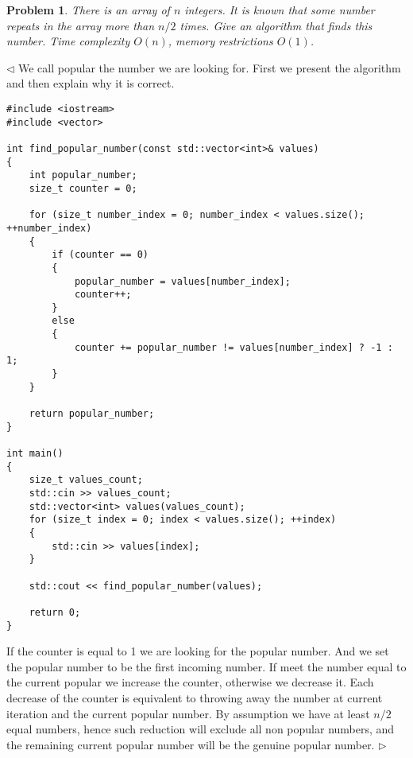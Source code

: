 \documentclass[12pt]{article}
\newtheorem{problem}{Problem}[subsection]
\newenvironment{solution}{\par $\triangleleft$}{$\triangleright$}
\begin{document}
 
\begin{problem} There is an array of $n$ integers. It is known that some number repeats in the array more than $n/2$ times. Give an algorithm that finds this number. Time complexity $O(n)$, memory restrictions $O(1)$.
\end{problem}
\begin{solution} 
We call popular the number we are looking for. First we present the algorithm and then explain why it is correct.
\begin{verbatim}
#include <iostream>
#include <vector>
 
int find_popular_number(const std::vector<int>& values)
{
    int popular_number;
    size_t counter = 0;
 
    for (size_t number_index = 0; number_index < values.size(); ++number_index)
    {
        if (counter == 0)
        {
            popular_number = values[number_index];
            counter++;
        }
        else
        {
            counter += popular_number != values[number_index] ? -1 : 1;
        }
    }
 
    return popular_number;
}
 
int main()
{
    size_t values_count;
    std::cin >> values_count;
    std::vector<int> values(values_count);
    for (size_t index = 0; index < values.size(); ++index)
    {
        std::cin >> values[index];
    }
 
    std::cout << find_popular_number(values);
 
    return 0;
}
\end{verbatim}
 
If the counter is equal to 1 we are looking for the popular number. And we set the popular number to be the first incoming number. If meet the number equal to the current popular we increase the counter, otherwise we decrease it. Each decrease of the counter is equivalent to throwing away the number at current iteration and the current popular number. By assumption we have at least $n/2$ equal numbers, hence such reduction will exclude all non popular numbers, and the remaining current popular number will be the genuine popular number.
\end{solution}
 
 
 
 
 
 
 
 
 
 
 
 
 
 
 
\end{document}
